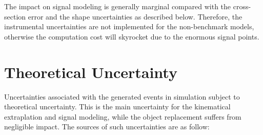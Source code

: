 The impact on signal modeling is generally marginal compared with the cross-section error and the shape uncertainties as described below.
Therefore, the instrumental uncertainties are not implemented for the non-benchmark models, otherwise the computation cost will skyrocket due to the enormous signal points.
\fi

\clearpage
%



\section{Theoretical Uncertainty} \label{sec::Uncertainties::theoUnct}
Uncertainties associated with the generated events in simulation subject to theoretical uncertainty.
This is the main uncertainty for the kinematical extraplation and signal modeling, while the object replacement suffers from negligible impact.
The sources of such uncertainties are as follow: 
%
